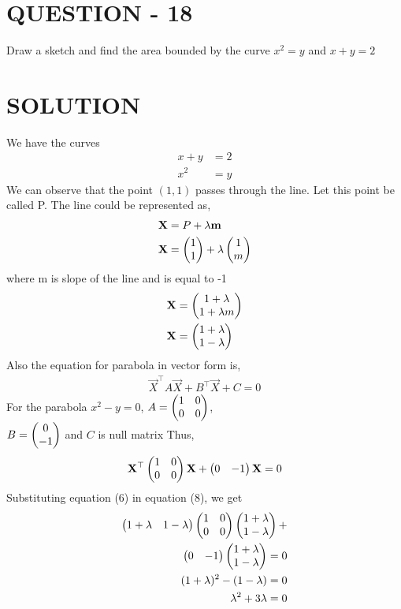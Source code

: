\section{\textbf{QUESTION - 18}}
Draw a sketch and find the area bounded by the curve $x^2 = y$ and $x + y = 2$
\section{\textbf{SOLUTION}}
We have the curves
\begin{align}
    x + y &= 2\\
    x^2 &= y
\end{align}
We can observe that the point $(1,1)$ passes through the line. Let this point be called P. The line could be represented as,\\
\begin{align}
    \mathbf{X} &= P + \lambda \mathbf{m}\\
    \mathbf{X} &= \begin{pmatrix}1 \\ 1\end{pmatrix} + \lambda \begin{pmatrix}1 \\ m\end{pmatrix}
\end{align}
where m is slope of the line and is equal to -1
\begin{align}
    \mathbf{X} &= \begin{pmatrix}1 + \lambda \\ 1 + \lambda m\end{pmatrix}\\
    \mathbf{X} &= \begin{pmatrix}1 + \lambda \\ 1 - \lambda\end{pmatrix}
\end{align}
Also the equation for parabola in vector form is,
\begin{align}
    \vec{X}^{\top}A\vec{X} + B^{\top}\vec{X} + C = 0
\end{align}
For the parabola $x^2 - y = 0$, $A = \begin{pmatrix}1 & 0 \\ 0 & 0\end{pmatrix}$,\\ $B = \begin{pmatrix}0 \\ -1\end{pmatrix}$ and $C$ is null matrix
Thus,
\begin{align}
    \mathbf{X}^{\top} \begin{pmatrix}1 & 0 \\ 0 & 0\end{pmatrix}\mathbf{X} + \begin{pmatrix}0 & -1\end{pmatrix}\mathbf{X} = 0
\end{align}
Substituting equation (6) in equation (8), we get
\begin{align}
    \begin{pmatrix}1 + \lambda & 1 - \lambda\end{pmatrix}\begin{pmatrix}1 & 0 \\ 0 & 0\end{pmatrix}\begin{pmatrix}1 + \lambda \\ 1 - \lambda\end{pmatrix} + \\ \begin{pmatrix}0 & -1\end{pmatrix}\begin{pmatrix}1 + \lambda \\ 1 - \lambda\end{pmatrix} = 0\\
    (1 + \lambda)^2 - (1 - \lambda) = 0\\
    \lambda^2 + 3\lambda = 0
\end{align}
